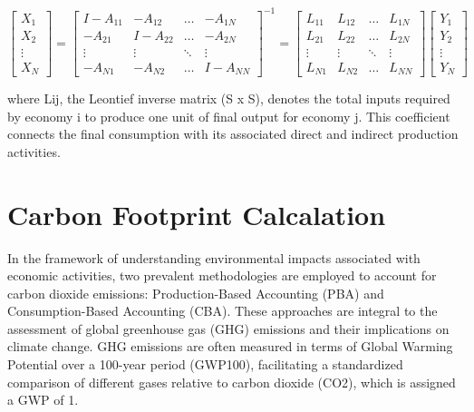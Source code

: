 \begin{equation}
\begin{bmatrix}
X_1 \\
X_2 \\
\vdots \\
X_N
\end{bmatrix} =
\begin{bmatrix}
I-A_{11} & -A_{12} & \dots & -A_{1N} \\
-A_{21} & I-A_{22} & \dots & -A_{2N} \\
\vdots & \vdots & \ddots & \vdots \\
-A_{N1} & -A_{N2} & \dots & I-A_{NN}
\end{bmatrix}^{-1}=
\begin{bmatrix}
L_{11} & L_{12} & \dots & L_{1N} \\
L_{21} & L_{22} & \dots & L_{2N} \\
\vdots & \vdots & \ddots & \vdots \\
L_{N1} & L_{N2} & \dots & L_{NN}
\end{bmatrix}
\begin{bmatrix}
Y_1 \\
Y_2 \\
\vdots \\
Y_N
\end{bmatrix}
\label{eq:X_LY}
\end{equation}

where Lij, the Leontief inverse matrix (S x S), denotes the total inputs required by economy i to produce one unit of final output for economy j. This coefficient connects the final consumption with its associated direct and indirect production activities.

\section{Carbon Footprint Calcalation}

In the framework of understanding environmental impacts associated with economic activities, two prevalent methodologies are employed to account for carbon dioxide emissions: Production-Based Accounting (PBA) and Consumption-Based Accounting (CBA). These approaches are integral to the assessment of global greenhouse gas (GHG) emissions and their implications on climate change. GHG emissions are often measured in terms of Global Warming Potential over a 100-year period (GWP100), facilitating a standardized comparison of different gases relative to carbon dioxide (CO2), which is assigned a GWP of 1.

